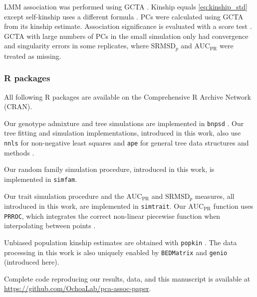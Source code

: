 \documentclass[11pt]{article}
\newcommand{\rmsd}{\text{SRMSD}_p}
\newcommand{\auc}{\text{AUC}_\text{PR}}
\begin{document}
LMM association was performed using GCTA \citep{yang_gcta:_2011}.
Kinship equals \cref{eq:kinship_std} except self-kinship uses a different formula \citep{yang_gcta:_2011}.
PCs were calculated using GCTA from its kinship estimate.
Association significance is evaluated with a score test \citep{yang_advantages_2014}.
GCTA with large numbers of PCs in the small simulation only had convergence and singularity errors in some replicates, where $\rmsd$ and $\auc$ were treated as missing.

\subsubsection{R packages}
All following R packages are available on the Comprehensive R Archive Network (CRAN).

Our genotype admixture and tree simulations are implemented in \texttt{bnpsd} \citep{ochoa_estimating_2021}.
Our tree fitting and simulation implementations, introduced in this work, also use \texttt{nnls} for non-negative least squares \citep{mullen_nnls_2012} and \texttt{ape} for general tree data structures and methods \citep{paradis_ape_2019}.

Our random family simulation procedure, introduced in this work, is implemented in \texttt{simfam}.

Our trait simulation procedure and the $\auc$ and $\rmsd$ measures, all introduced in this work, are implemented in \texttt{simtrait}.
Our $\auc$ function uses \texttt{PRROC}, which integrates the correct non-linear piecewise function when interpolating between points \citep{grau_prroc:_2015}.

Unbiased population kinship estimates are obtained with \texttt{popkin} \citep{ochoa_estimating_2021}.
The data processing in this work is also uniquely enabled by \texttt{BEDMatrix} \citep{grueneberg_bgdata_2019} and \texttt{genio} (introduced here).

Complete code reproducing our results, data, and this manuscript is available at \url{https://github.com/OchoaLab/pca-assoc-paper}.

\end{document}
